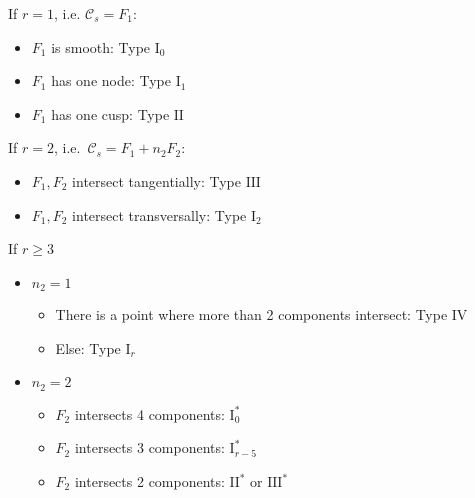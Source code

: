 \documentclass[a4paper]{article}
\begin{document}
\noindent If $r = 1 $, i.e. $\mathcal{C} _s = F_1$:
\begin{itemize}
	\item $F_1$ is smooth: Type $\text{I}_0$
	\item $F_1$ has one node: Type $\text{I}_1$
	\item $F_1$ has one cusp: Type $\text{II}$
\end{itemize}
If $r = 2$, i.e.\ $\mathcal{C} _s = F_1 + n_2 F_2$:
\begin{itemize}
	\item $F_1, F_2$ intersect tangentially: Type $\text{III}$ 
	\item $F_1, F_2$ intersect transversally: Type $\text{I}_2$
\end{itemize}
If $r \ge 3$
 \begin{itemize}
	\item  $n_2 = 1$
		\begin{itemize}
			\item There is a point where more than 2 components intersect: Type IV
			\item Else: Type $\text{I}_r$
		\end{itemize}
	\item $n_2 = 2$
		\begin{itemize}
			\item $F_2$ intersects 4 components: $\text{I}^*_0$
			\item  $F_2$ intersects 3 components: $\text{I}^*_{r - 5}$
			\item $F_2$ intersects 2 components: $\text{II}^*$ or $\text{III}^*$ 
		\end{itemize}
\end{itemize}

\printbibliography
\end{document}
